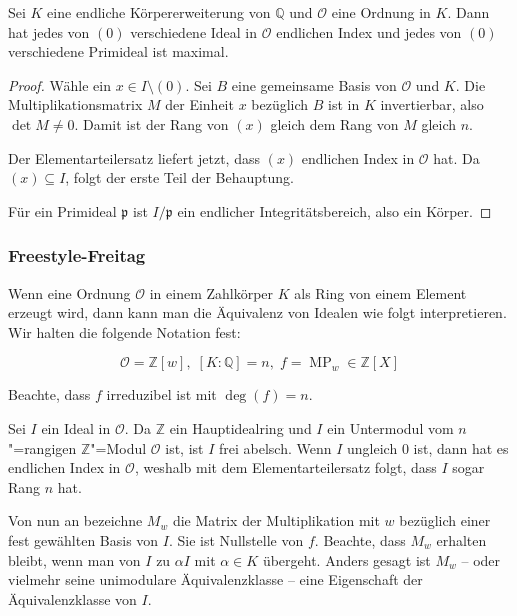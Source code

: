 \documentclass[ngerman, 11pt, a4paper, twoside, abstracton]{scrartcl}
\begin{document}
\begin{lemma}
  Sei $K$ eine endliche Körpererweiterung von $\mathbb{Q}$ und $\mathcal{O}$ eine Ordnung in $K$. Dann hat jedes von $\left( 0 \right)$ verschiedene Ideal in $\mathcal{O}$ endlichen Index und jedes von $\left( 0 \right)$ verschiedene Primideal ist maximal.
\end{lemma}
\begin{proof}
  Wähle ein $x\in I\setminus \left( 0 \right)$.
  Sei $B$ eine gemeinsame Basis von $\mathcal{O}$ und $K$. Die Multiplikationsmatrix $M$ der Einheit $x$ bezüglich $B$ ist in $K$ invertierbar, also $\det M \ne 0$. Damit ist der Rang von $\left( x \right)$ gleich dem Rang von $M$ gleich $n$.

  Der Elementarteilersatz liefert jetzt, dass $\left( x \right)$ endlichen Index in $\mathcal{O}$ hat. Da $\left( x \right) \subseteq I$, folgt der erste Teil der Behauptung.

  Für ein Primideal $\mathfrak{p}$ ist $I/\mathfrak{p}$ ein endlicher Integritätsbereich, also ein Körper.
\end{proof}

\subsubsection{Freestyle-Freitag}

Wenn eine Ordnung $\mathcal{O}$ in einem Zahlkörper $K$ als Ring von einem Element erzeugt wird, dann kann man die Äquivalenz von Idealen wie folgt interpretieren. Wir halten die folgende Notation fest:

\[
  \mathcal{O} = \mathbb{Z}\left[ w \right],\; \left[ K : \mathbb{Q} \right] = n,\; f = \operatorname{MP}_w \in \mathbb{Z}\left[ X \right]
\]

Beachte, dass $f$ irreduzibel ist mit $\deg\left( f \right) = n$.

Sei $I$ ein Ideal in $\mathcal{O}$. Da $\mathbb{Z}$ ein Hauptidealring und $I$ ein Untermodul vom $n$"=rangigen $\mathbb{Z}$"=Modul $\mathcal{O}$ ist, ist $I$ frei abelsch. Wenn $I$ ungleich $0$ ist, dann hat es endlichen Index in $\mathcal{O}$, weshalb mit dem Elementarteilersatz folgt, dass $I$ sogar Rang $n$ hat.

Von nun an bezeichne $M_w$ die Matrix der Multiplikation mit $w$ bezüglich einer fest gewählten Basis von $I$. Sie ist Nullstelle von $f$. Beachte, dass $M_w$ erhalten bleibt, wenn man von $I$ zu $\alpha I$ mit $\alpha \in K$ übergeht. Anders gesagt ist $M_w$ -- oder vielmehr seine unimodulare Äquivalenzklasse -- eine Eigenschaft der Äquivalenzklasse von $I$.
\end{document}
